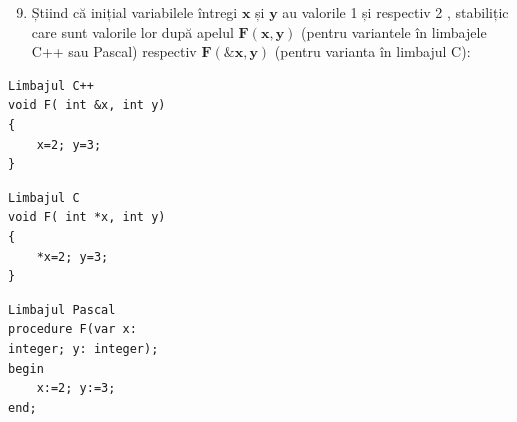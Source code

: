 \documentclass[10pt]{article}
\begin{document}
\begin{enumerate}
  \setcounter{enumi}{8}
  \item Știind că inițial variabilele întregi $\mathbf{x}$ și $\mathbf{y}$ au valorile 1 și respectiv 2 , stabilițic care sunt valorile lor după apelul $\mathbf{F}(\mathbf{x}, \mathbf{y})$ (pentru variantele în limbajele C++ sau Pascal) respectiv $\mathbf{F}(\& \mathbf{x}, \mathbf{y})$ (pentru varianta în limbajul C):
\end{enumerate}

\begin{verbatim}
Limbajul C++
void F( int &x, int y)
{
    x=2; y=3;
}
\end{verbatim}

\begin{verbatim}
Limbajul C
void F( int *x, int y)
{
    *x=2; y=3;
}
\end{verbatim}

\begin{verbatim}
Limbajul Pascal
procedure F(var x:
integer; y: integer);
begin
    x:=2; y:=3;
end;
\end{verbatim}
\end{document}
